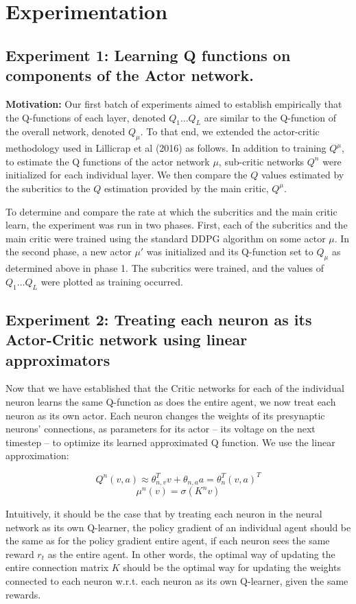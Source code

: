 \section{Experimentation}
\subsection{Experiment 1: Learning Q functions on components of the Actor network.}

\textbf{Motivation:}
Our first batch of experiments aimed to establish empirically that the Q-functions of each layer, denoted $Q_1...Q_L$ are similar to the Q-function of the overall network, denoted $Q_{\mu}$. To that end, we extended the actor-critic methodology used in Lillicrap et al (2016) as follows. In addition to training $Q^\mu$, to estimate the Q functions of the actor network $\mu$, sub-critic networks $Q^n$ were initialized for each individual layer. We then compare the $Q$ values estimated by the subcritics to the $Q$ estimation provided by the main critic, $Q^\mu$. 

To determine and compare the rate at which the subcritics and the main critic learn, the experiment was run in two phases. First, each of the subcritics and the main critic were trained using the standard DDPG algorithm on some actor $\mu$. In the second phase, a new actor $\mu'$ was initialized and its Q-function set to $Q_{\mu}$ as determined above in phase 1. The subcritics were trained, and the values of $Q_1\dots Q_{L}$ were plotted as training occurred.

\subsection{Experiment 2: Treating each neuron as its Actor-Critic network using linear approximators}

Now that we have established that the Critic networks for each of the individual neuron learns the same Q-function as does the entire agent, we now treat each neuron as its own actor. Each neuron changes the weights of its presynaptic neurons' connections, as parameters for its actor -- its voltage on the next timestep -- to optimize its learned approximated Q function. We use the linear approximation:

$$Q^{n}(v, a) \approx \theta_{n,v}^T v + \theta_{n,a}a = \theta_{n}^T (v, a)^T$$
$$\mu^{n}(v) = \sigma(K^n v)$$

Intuitively, it should be the case that by treating each neuron in the neural network as its own Q-learner, the policy gradient of an individual agent should be the same as for the policy gradient entire agent, if each neuron sees the same reward $r_t$ as the entire agent. In other words, the optimal way of updating the entire connection matrix $K$ should be the optimal way for updating the weights connected to each neuron w.r.t. each neuron as its own Q-learner, given the same rewards.

